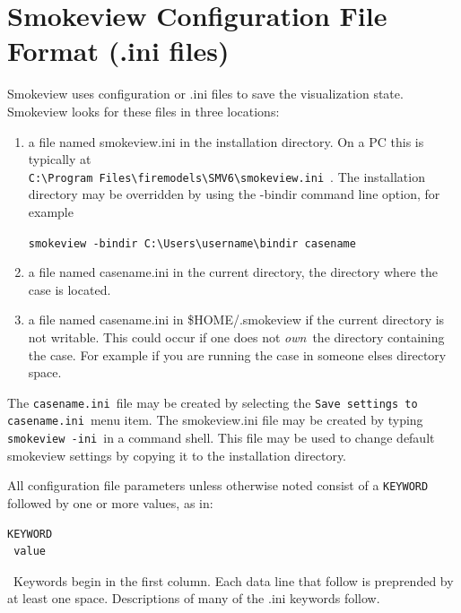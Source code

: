 \documentclass[11pt,twoside]{book}
\begin{document}
\section{Smokeview Configuration File Format (.ini files)}
\label{sectionconfig}
\label{appendixini}

Smokeview uses configuration or .ini files to save the visualization state.
Smokeview looks for these files in three locations:
\begin{enumerate}
\item a file named smokeview.ini in the installation directory.  On a PC this is typically at\\
{\tt C:\textbackslash Program~Files\textbackslash firemodels\textbackslash SMV6\textbackslash smokeview.ini}~.
The installation directory may be
overridden by using the -bindir command line option, for example

{\tt smokeview -bindir C:\textbackslash Users\textbackslash username\textbackslash bindir casename}

\item a file named casename.ini in the current directory, the directory where the case is located.
\item a file named casename.ini in \$HOME/.smokeview if the current directory is not writable.
This could occur if one does not {\em own}\ the directory containing the case.
For example if you are running the case in someone elses directory space.
\end{enumerate}

The {\tt casename.ini}\ file may be created by selecting the {\tt Save settings to casename.ini}\ menu item.
The smokeview.ini file may be created by typing {\tt smokeview -ini}\ in a command shell.
This file may be used to change default smokeview settings by copying it
to the installation directory.

All configuration file parameters unless otherwise noted consist of a {\tt KEYWORD}
followed by one or more values, as in:
\begin{lstlisting}
KEYWORD
 value
\end{lstlisting}
\ Keywords begin in the first column.
Each data line that follow is preprended by at least one space.
Descriptions of many of the .ini keywords follow.
\end{document}
